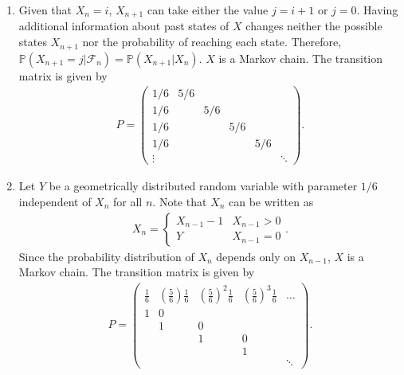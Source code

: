 \documentclass[12pt]{book}
\numberwithin{equation}{chapter}
\theoremstyle{plain}
\numberwithin{theorem}{section}
\theoremstyle{definition}
\numberwithin{exercise}{chapter}
\newcommand{\<}{\langle}
\renewcommand{\>}{\rangle}
\renewcommand{\(}{\left(}
\renewcommand{\)}{\right)}
\renewcommand{\[}{\left[}
\renewcommand{\]}{\right]}
\newcommand\Pb{\mathds{P}}
\newcommand\Fc{\mathscr{F}}
\begin{document}
\begin{enumerate}
\begin{align}
	\end{align}
\item[(c.)] Given that $X_{n} = i$, $X_{n+1}$ can take either the value $j = i+1$ or $j= 0$. Having additional 
information about past states of $X$ changes neither the possible states $X_{n+1}$ nor the probability of reaching each 
state. Therefore, $\Pb( X_{n+1} = j | \Fc_n) = \Pb( X_{n+1} | X_n)$. $X$ is a Markov chain. The transition matrix is 
given by
\begin{align}
P = 
\begin{pmatrix}
1/6 & 5/6 \\
1/6 &  & 5/6 \\
1/6 &  &  & 5/6 \\
1/6 &  &  &  & 5/6 \\
\vdots & & & & & \ddots
\end{pmatrix}.
\end{align}
\item[(d.)] Let $Y$ be a geometrically distributed random variable with parameter $1/6$ independent of $X_n$ 
for all $n$. Note that $X_n$ can be written as 
	\begin{align}
	X_{n}
		= \left\{
		\begin{array}{lr}
		X_{n-1} - 1 & X_{n-1} > 0 \\
		Y & X_{n-1} = 0
		\end{array}
		\right. .
	\end{align}
	Since the probability distribution of $X_n$ depends only on $X_{n-1}$, $X$ is a Markov chain. The transition 
matrix is given by
\begin{align}
P = 
\begin{pmatrix}
\tfrac{1}{6} & (\tfrac{5}{6})\tfrac{1}{6} & (\tfrac{5}{6})^2\tfrac{1}{6} & (\tfrac{5}{6})^3\tfrac{1}{6} & \hdots \\
1 & 0\\
 & 1 & 0\\
 & & 1 & 0 \\
 & & & 1 \\
 & & & & \ddots
\end{pmatrix}.
\end{align}
\end{enumerate}
\end{document}
